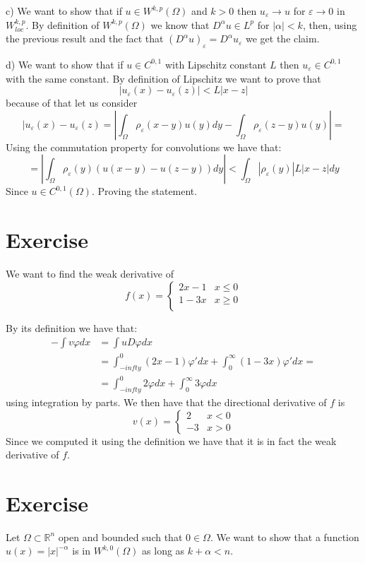\documentclass{article}
\newcommand{\R}{\mathbb{R}}
\begin{document}
c) We want to show that if $u \in W^{k,p} (\Omega)$ and $k>0$ then $u_\varepsilon \to u$ for $\varepsilon \to 0$ in $W_{loc}^{k,p}$. By definition of $W^{k,p} (\Omega)$ we know that $D^\alpha u \in L^p$ for $|\alpha| < k$, then, using the previous result and the fact that ${(D^\alpha u)}_\varepsilon= D^\alpha u_\varepsilon$ we get the claim.

d) We want to show that if $u \in C^{0,1}$ with Lipschitz constant $L$ then $u_\varepsilon \in C^{0,1}$ with the same constant. By definition of Lipschitz we want to prove that
\[
    |u_\varepsilon(x) - u_\varepsilon(z)| < L |x-z|
\]
because of that let us consider
\[
    |u_\varepsilon(x) - u_\varepsilon(z) = \left| \int_{\Omega} \rho_\varepsilon(x-y) u(y) dy - \int_\Omega \rho_\varepsilon(z-y) u(y) \right| =
\]
Using the commutation property for convolutions we have that:
\[
    = \left| \int_\Omega \rho_\varepsilon(y) (u(x-y) - u (z-y)) dy \right| < \int_\Omega |\rho_\varepsilon(y)| L |x-z| dy
\]
Since $u \in C^{0,1}(\Omega)$. Proving the statement.

\section{Exercise}
We want to find the weak derivative of
\[
    f(x) = \begin{cases}
        2x - 1 & x\leq 0 \\
        1-3x & x \geq 0 \\
    \end{cases}
\]

By its definition we have that:
\[
    \begin{split}
        -\int v \varphi dx &= \int u D\varphi dx\\
        &= \int_{-infty}^0 (2x-1) \varphi' dx + \int_0^{\infty} (1-3x) \varphi' dx = \\
        &= \int_{-infty}^0 2 \varphi dx + \int_0^{\infty} 3 \varphi dx
    \end{split}
\]
using integration by parts. We then have that the directional derivative of $f$ is 
\[
    v(x) = \begin{cases}
        2 & x < 0\\
        -3 & x> 0
    \end{cases}
\]
Since we computed it using the definition we have that it is in fact the weak derivative of $f$.
\section{Exercise}
Let $\Omega \subset \R^n$ open and bounded such that $0 \in \Omega$. We want to show that a function $u(x) = | x |^{- \alpha}$  is in $W^{ k,0 } (\Omega)$ as long as $k+\alpha < n$.
\end{document}
